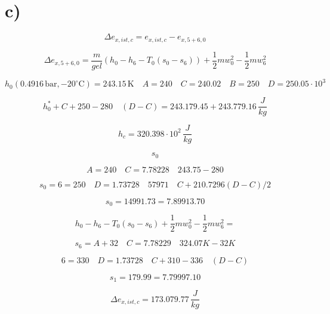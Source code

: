 

\section*{c)}

\[
\Delta e_{x,ist,c} = e_{x,ist,c} - e_{x,5+6,0}
\]

\[
\Delta e_{x,5+6,0} = \frac{m}{gel} \left( h_0 - h_6 - T_0 (s_0 - s_6) \right) + \frac{1}{2} m w_0^2 - \frac{1}{2} m w_6^2
\]

\[
h_0 \left( 0.4916 \, \text{bar}, -20^\circ \text{C} \right) = 243.15 \, \text{K} \quad A = 240 \quad C = 240.02 \quad B = 250 \quad D = 250.05 \cdot 10^3
\]

\[
h_0^* + C + 250 - 280 \quad (D - C) = 243.179.45 + 243.779.16 \, \frac{J}{kg}
\]

\[
h_c = 320.398 \cdot 10^2 \, \frac{J}{kg}
\]

\[
s_0
\]

\[
A = 240 \quad C = 7.78228 \quad 243.75 - 280
\]

\[
s_0 = 6 = 250 \quad D = 1.73728 \quad 57971 \quad C + 210.7296 (D - C) / 2
\]

\[
s_0 = 14991.73 = 7.89913.70
\]

\[
h_0 - h_6 - T_0 (s_0 - s_6) + \frac{1}{2} m w_0^2 - \frac{1}{2} m w_6^2 =
\]

\[
s_6 = A + 32 \quad C = 7.78229 \quad 324.07 K - 32 K
\]

\[
6 = 330 \quad D = 1.73728 \quad C + 310 - 336 \quad (D - C)
\]

\[
s_1 = 179.99 = 7.79997.10
\]

\[
\Delta e_{x,ist,c} = 173.079.77 \, \frac{J}{kg}
\]